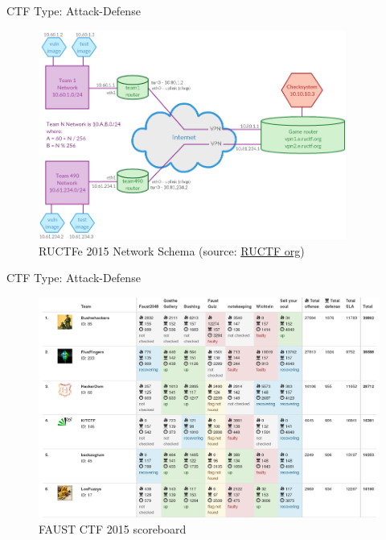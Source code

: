 \begin{frame}
  {CTF Type: Attack-Defense}

  \begin{figure}[h]
    \centering
    \includegraphics[width=0.9\textwidth]{./images/ructf-network.png}
    \caption{\footnotesize
      RUCTFe 2015 Network Schema (source:
      \href{https://ructf.org/e/2015/network.html}{RUCTF org}) }
  \end{figure}
\end{frame}

\begin{frame}
  {CTF Type: Attack-Defense}

  \begin{figure}[h]
    \centering
    \includegraphics[width=\textwidth]{./images/faustctf-scoreboard.png}
    \caption{\footnotesize{}FAUST CTF 2015 scoreboard}
    \label{fig:faustctfscoreboard}
  \end{figure}

\end{frame}


